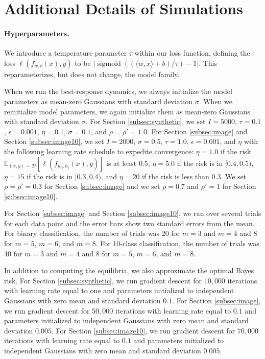 \documentclass[letterpaper,11pt]{article}
\theoremstyle{plain}
\DeclareMathOperator*{\sigmoid}{sigmoid}
\begin{document}
\printbibliography

\newpage 

\appendix


\section{Additional Details of Simulations }\label{appendix:setup}

\paragraph{Hyperparameters. } We introduce a temperature parameter $\tau$ within our loss function, defining the loss $\ell(f_{w,b}(x), y)$ to be $|\sigmoid((\langle w, x \rangle + b)/\tau) - 1|$. This reparameterizes, but does not change, the model family. 

When we run the best-response dynamics, we always initialize the model parameters as mean-zero Gaussians with standard deviation $\sigma$. When we reinitialize model parameters, we again initialize them as mean-zero Gaussians with standard deviation $\sigma$. For Section \ref{subsec:synthetic}, we set  $I = 5000$,  $\tau = 0.1$, $\epsilon = 0.001$, $\eta = 0.1$, $\sigma = 0.1$, and $\rho = \rho' = 1.0$. For Section \ref{subsec:image} and Section \ref{subsec:image10}, we set $I = 2000$, $\sigma = 0.5$, $\tau = 1.0$, $\epsilon = 0.001$, and $\eta$ with the following learning rate schedule to expedite convergence: $\eta = 1.0$ if the risk $\mathbb{E}_{(x,y) \sim \mathcal{D}}[\ell(f_{w_j, b_j}(x), y)]$ is at least $0.5$, $\eta = 5.0$ if the risk is in $[0.4, 0.5)$, $\eta = 15$ if the risk is in $[0.3, 0.4)$, and $\eta = 20$ if the risk is less than $0.3$. We set $\rho = \rho' = 0.3$ for Section \ref{subsec:image} and we set $\rho = 0.7$ and $\rho' = 1$ for Section \ref{subsec:image10}. 

For Section \ref{subsec:image} and Section \ref{subsec:image10}, we ran over several trials for each data point and the error bars show two standard errors from the mean. For binary classification, the number of trials was 20 for $m = 3$ and $m = 4$ and 8 for $m =5$, $m = 6$, and $m = 8$. For 10-class classification, the number of trials was 40 for $m = 3$ and $m = 4$ and 8 for $m =5$, $m = 6$, and $m = 8$. 

In addition to computing the equilibria, we also approximate the optimal Bayes risk. For Section \ref{subsec:synthetic}, we run gradient descent for $10,000$ iterations with learning rate equal to one and parameters initialized to independent Gaussians with zero mean and standard deviation $0.1$. For Section \ref{subsec:image}, we run gradient descent for $50,000$ iterations with learning rate equal to $0.1$ and parameters initialized to independent Gaussians with zero mean and standard deviation $0.005$. For Section \ref{subsec:image10}, we run gradient descent for $70,000$ iterations with learning rate equal to $0.1$ and parameters initialized to independent Gaussians with zero mean and standard deviation $0.005$. 
\end{document}
